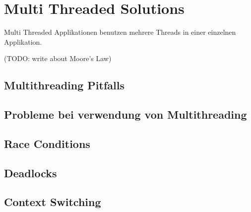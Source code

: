 \section{Multi Threaded Solutions}
\label{section: Multi Threaded Solutions}

Multi Threaded Applikationen benutzen mehrere Threads in einer einzelnen Applikation. \cite[p. 1]{DabMIT}


(TODO: write about Moore’s Law)

\subsection{Multithreading Pitfalls}
\label{subsection: multithreading pitfalls}

\cite[p. 2]{Sch97}


\subsection{Probleme bei verwendung von Multithreading}

\subsection{Race Conditions}



\subsection{Deadlocks}
\subsection{Context Switching}